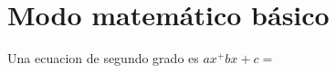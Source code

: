 \documentclass[10pt,a4paper]{article}
\author{Gustavo}
\begin{document}
\section{Modo matemático básico}
Una ecuacion de segundo grado es
$ax^+bx+c=$
\end{document}
